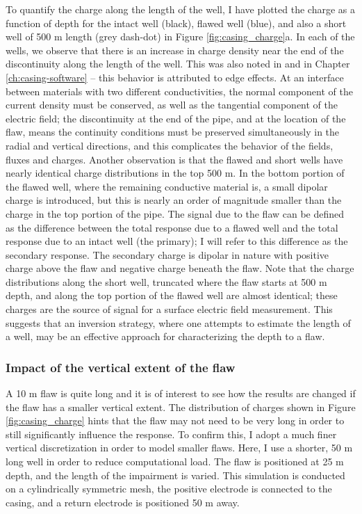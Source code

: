 To quantify the charge along the length of the well, I have plotted the charge as a function of depth for the intact well (black), flawed well (blue), and also a short well of 500 m length (grey dash-dot) in Figure \ref{fig:casing_charge}a. In each of the wells, we observe that there is an increase in charge density near the end of the discontinuity along the length of the well. This was also noted in \cite{Griffiths1997} and in Chapter \ref{ch:casing-software} -- this behavior is attributed to edge effects. At an interface between materials with two different conductivities, the normal component of the current density must be conserved, as well as the tangential component of the electric field; the discontinuity at the end of the pipe, and at the location of the flaw, means the continuity conditions must be preserved simultaneously in the radial and vertical directions, and this complicates the behavior of the fields, fluxes and charges. Another observation is that the flawed and short wells have nearly identical charge distributions in the top 500 m. In the bottom portion of the flawed well, where the remaining conductive material is, a small dipolar charge is introduced, but this is nearly an order of magnitude smaller than the charge in the top portion of the pipe. The signal due to the flaw can be defined as the difference between the total response due to a flawed well and the total response due to an intact well (the primary); I  will refer to this difference as the secondary response. The secondary charge is dipolar in nature with positive charge above the flaw and negative charge beneath the flaw. Note that the charge distributions along the short well, truncated where the flaw starts at 500 m depth, and along the top portion of the flawed well are almost identical; these charges are the source of signal for a surface electric field measurement. This suggests that an inversion strategy, where one attempts to estimate the length of a well, may be an effective approach for characterizing the depth to a flaw.




\subsubsection{Impact of the vertical extent of the flaw}

A 10 m flaw is quite long and it is of interest to see how the results are changed if the flaw has a smaller vertical extent. The distribution of charges shown in Figure \ref{fig:casing_charge} hints that the flaw may not need to be very long in order to still significantly influence the response. To confirm this, I adopt a much finer vertical discretization in order to model smaller flaws. Here, I use a shorter, 50 m long well in order to reduce computational load. The flaw is positioned at 25 m depth, and the length of the impairment is varied. This simulation is conducted on a cylindrically symmetric mesh, the positive electrode is connected to the casing, and a return electrode is positioned 50 m away.


